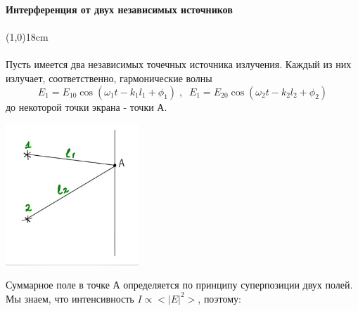 \documentclass[a4paper]{article}
\begin{document}
 
\large
\noindent \textbf{Интерференция от двух независимых источников}\\
\\
\normalsize
\line(1,0){18cm}\\
\\
\small
Пусть имеется два независимых точечных источника излучения. Каждый из них излучает, соответственно, гармонические волны 
\begin{equation}
E_1 = E_{10}\cos(\omega_1 t - k_1l_1 + \phi_1) \; , \; \; E_1 = E_{20}\cos(\omega_2 t - k_2l_2 + \phi_2)
\end{equation}
до некоторой точки экрана - точки А.\\
\begin{center}
\includegraphics[width=5cm]{t1}
\end{center}
Суммарное поле в точке А определяется по принципу суперпозиции двух полей.\\
Мы знаем, что интенсивность $I \propto <|E|^2>$, поэтому:
\end{document}
